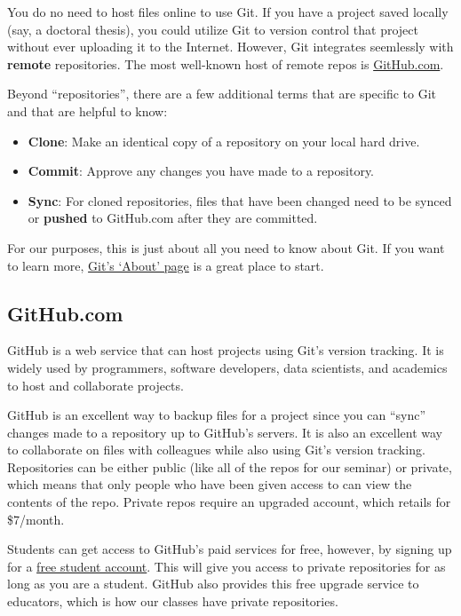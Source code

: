 \documentclass[]{book}
\providecommand{\tightlist}{%
  \setlength{\itemsep}{0pt}\setlength{\parskip}{0pt}}
\theoremstyle{definition}
\theoremstyle{definition}
\theoremstyle{definition}
\theoremstyle{remark}
\begin{document}
You do no need to host files online to use Git. If you have a project
saved locally (say, a doctoral thesis), you could utilize Git to version
control that project without ever uploading it to the Internet. However,
Git integrates seemlessly with \textbf{remote} repositories. The most
well-known host of remote repos is
\protect\hyperlink{github.com}{GitHub.com}.

Beyond ``repositories'', there are a few additional terms that are
specific to Git and that are helpful to know:

\begin{itemize}
\tightlist
\item
  \textbf{Clone}: Make an identical copy of a repository on your local
  hard drive.
\item
  \textbf{Commit}: Approve any changes you have made to a repository.
\item
  \textbf{Sync}: For cloned repositories, files that have been changed
  need to be synced or \textbf{pushed} to GitHub.com after they are
  committed.
\end{itemize}

For our purposes, this is just about all you need to know about Git. If
you want to learn more, \href{https://git-scm.com/about}{Git's `About'
page} is a great place to start.

\hypertarget{github.com}{\subsection{GitHub.com}\label{github.com}}

GitHub is a web service that can host projects using Git's version
tracking. It is widely used by programmers, software developers, data
scientists, and academics to host and collaborate projects.

GitHub is an excellent way to backup files for a project since you can
``sync'' changes made to a repository up to GitHub's servers. It is also
an excellent way to collaborate on files with colleagues while also
using Git's version tracking. Repositories can be either public (like
all of the repos for our seminar) or private, which means that only
people who have been given access to can view the contents of the repo.
Private repos require an upgraded account, which retails for \$7/month.

Students can get access to GitHub's paid services for free, however, by
signing up for a \href{https://education.github.com}{free student
account}. This will give you access to private repositories for as long
as you are a student. GitHub also provides this free upgrade service to
educators, which is how our classes have private repositories.
\end{document}
